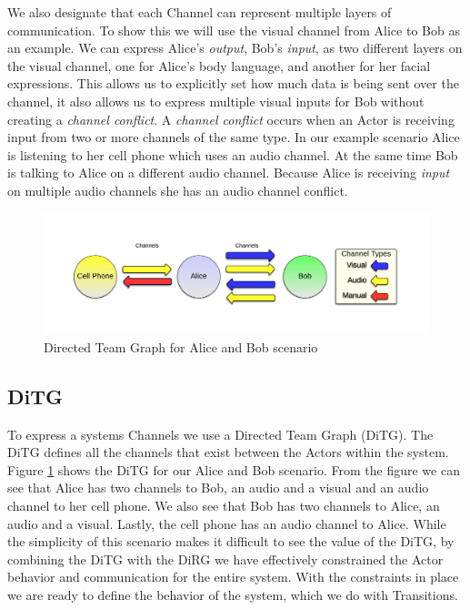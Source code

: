 We also designate that each Channel can represent multiple layers of communication.  To show this we will use the visual channel from Alice to Bob as an example.  We can express Alice's {\em output}, Bob's {\em input}, as two different layers on the visual channel, one for Alice's body language, and another for her facial expressions.  This allows us to explicitly set how much data is being sent over the channel, it also allows us to express multiple visual inputs for Bob without creating a {\em channel conflict}.  A {\em channel conflict} occurs when an Actor is receiving input from two or more channels of the same type.  In our example scenario Alice is listening to her cell phone which uses an audio channel.  At the same time Bob is talking to Alice on a different audio channel.  Because Alice is receiving {\em input} on multiple audio channels she has an audio channel conflict.  

\begin{figure}[h]
\begin{center}
\includegraphics[width=\textwidth]{ab_ditg.png}
\caption{Directed Team Graph for Alice and Bob scenario}
\label{fig:ab_ditg}
\end{center}
\end{figure}

\subsection{DiTG}
To express a systems Channels we use a Directed Team Graph (DiTG)\cite{moore2014modeling}.  The DiTG defines all the channels that exist between the Actors within the system.  Figure \ref{fig:ab_ditg} shows the DiTG for our Alice and Bob scenario.  From the figure we can see that Alice has two channels to Bob, an audio and a visual and an audio channel to her cell phone.  We also see that Bob has two channels to Alice, an audio and a visual.  Lastly, the cell phone has an audio channel to Alice.  While the simplicity of this scenario makes it difficult to see the value of the DiTG, by combining the DiTG with the DiRG we have effectively constrained the Actor behavior and communication for the entire system.  With the constraints in place we are ready to define the behavior of the system, which we do with Transitions.


